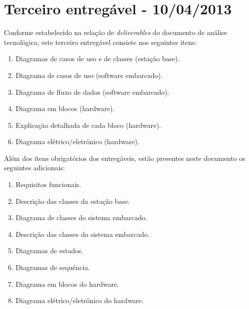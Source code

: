 \chapter{Terceiro entregável - 10/04/2013}

Conforme estabelecido na relação de \textit{deliverables} do documento de análise tecnológica, este terceiro entregável consiste nos seguintes itens:
\begin{enumerate}[topsep=0pt, partopsep=0pt, itemsep=0pt]
      \item Diagramas de casos de uso e de classes (estação base).
      \item Diagrama de casos de uso (software embarcado).
      \item Diagrama de fluxo de dados (software embarcado).
      \item Diagrama em blocos (hardware).
      \item Explicação detalhada de cada bloco (hardware).
      \item Diagrama elétrico/eletrônico (hardware).
\end{enumerate}

\vspace{12pt}

Além dos itens obrigatórios dos entregáveis, estão presentes neste documento os seguintes adicionais:
\begin{enumerate}
	\item Requisitos funcionais.
	\item Descrição das classes da estação base.
	\item Diagrama de classes do sistema embarcado.
	\item Descrição das classes do sistema embarcado.
	\item Diagramas de estados.
	\item Diagramas de sequência.
	\item Diagrama em blocos do hardware.
	\item Diagrama elétrico/eletrônico do hardware.
\end{enumerate}
